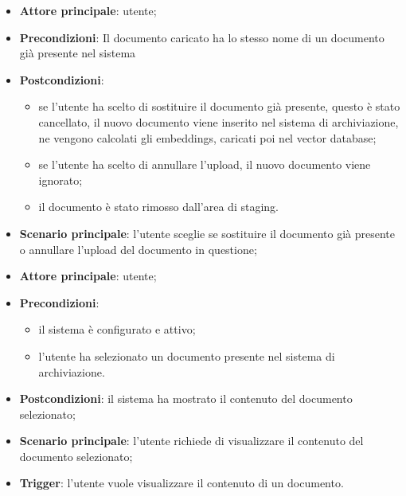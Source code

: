 \documentclass[10pt, a4paper]{article}
\begin{document}
    \begin{itemize}
        \item \textbf{Attore principale}: utente;
        \item \textbf{Precondizioni}: Il documento caricato ha lo stesso nome di un documento già presente nel sistema
        \item \textbf{Postcondizioni}:
        \begin{itemize}
            \item se l'utente ha scelto di sostituire il documento già presente, questo è stato cancellato, il nuovo documento viene inserito nel sistema di archiviazione, ne vengono calcolati gli embeddings, caricati poi nel vector database;
            \item se l'utente ha scelto di annullare l'upload, il nuovo documento viene ignorato;
            \item il documento è stato rimosso dall’area di staging.
        \end{itemize}
        \item \textbf{Scenario principale}: l’utente sceglie se sostituire il documento già presente o annullare l'upload del documento in questione;
    \end{itemize}
    

    \begin{itemize}
        \item \textbf{Attore principale}: utente;
        \item \textbf{Precondizioni}:
        \begin{itemize}
            \item il sistema è configurato e attivo;
            \item l’utente ha selezionato un documento presente nel sistema di archiviazione.
        \end{itemize}
        \item \textbf{Postcondizioni}: il sistema ha mostrato il contenuto del documento selezionato;
        \item \textbf{Scenario principale}: l’utente richiede di visualizzare il contenuto del documento selezionato;
        \item \textbf{Trigger}: l’utente vuole visualizzare il contenuto di un documento.
    \end{itemize}
\end{document}
